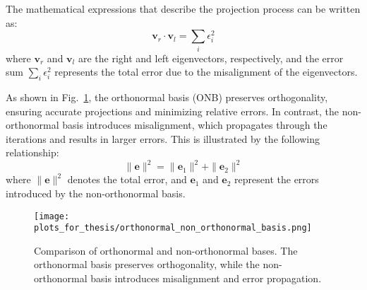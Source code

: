 The mathematical expressions that describe the projection process can be written as:
\[
\mathbf{v}_r \cdot \mathbf{v}_l =  \sum_{i} \epsilon_i^2
\]
where \( \mathbf{v}_r \) and \( \mathbf{v}_l \) are the right and left eigenvectors, respectively, and the error sum \( \sum_i \epsilon_i^2 \) represents the total error due to the misalignment of the eigenvectors.

As shown in Fig.~\ref{fig:non_orthonormal_vs_orthonormal}, the orthonormal basis (ONB) preserves orthogonality, ensuring accurate projections and minimizing relative errors. In contrast, the non-orthonormal basis introduces misalignment, which propagates through the iterations and results in larger errors. This is illustrated by the following relationship:
\[
\| \mathbf{e} \|^2 = \| \mathbf{e}_1 \|^2 + \| \mathbf{e}_2 \|^2
\]
where \( \| \mathbf{e} \|^2 \) denotes the total error, and \( \mathbf{e}_1 \) and \( \mathbf{e}_2 \) represent the errors introduced by the non-orthonormal basis.

\begin{figure}[ht]
    \centering
    \texttt{[image: plots\_for\_thesis/orthonormal\_non\_orthonormal\_basis.png]}
    \caption{\small Comparison of orthonormal and non-orthonormal bases. The orthonormal basis preserves orthogonality, while the non-orthonormal basis introduces misalignment and error propagation.}
    \label{fig:non_orthonormal_vs_orthonormal}
\end{figure}

